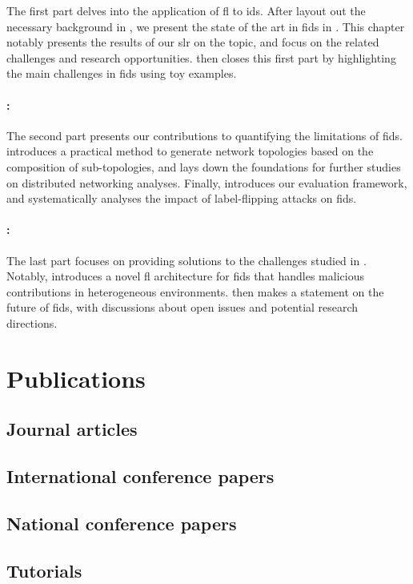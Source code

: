 The first part delves into the application of \gls{fl} to \gls{ids}.
After layout out the necessary background in , we present the state of the art in \gls{fids} in .
This chapter notably presents the results of our \gls{slr} on the topic, and focus on the related challenges and research opportunities.
 then closes this first part by highlighting the main challenges in \gls{fids} using toy examples.

\paragraph{:}

The second part presents our contributions to quantifying the limitations of \gls{fids}.
 introduces a practical method to generate network topologies based on the composition of sub-topologies, and lays down the foundations for further studies on distributed networking analyses.
Finally,  introduces our evaluation framework, and systematically analyses the impact of label-flipping attacks on \gls{fids}.

\paragraph{:}

The last part focuses on providing solutions to the challenges studied in .
Notably,  introduces a novel \gls{fl} architecture for \gls{fids} that handles malicious contributions in heterogeneous environments.
 then makes a statement on the future of \gls{fids}, with discussions about open issues and potential research directions.



\section{Publications\label{sec:intro.publications}}

\begin{refsection}
  \nocite{*}
  \subsection*{Journal articles}
  \printbibliography[heading=none,type=article]
  \subsection*{International conference papers}
  \printbibliography[heading=none,type=inproceedings,keyword=confs]
  \subsection*{National conference papers}
  \printbibliography[heading=none,type=inproceedings,keyword=national]
  \subsection*{Tutorials}
  \printbibliography[heading=none,keyword=tutorial]
\end{refsection}